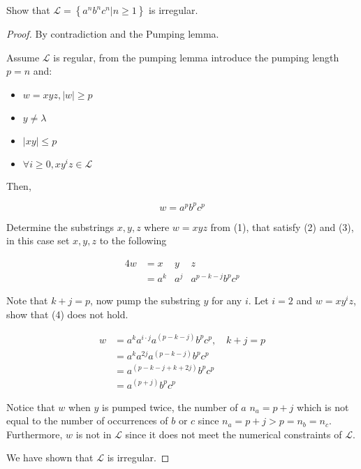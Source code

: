 \begin{ex}
    Show that $\mathcal{L} = \left\{a^nb^nc^n|n\geq 1\right\}$ is irregular.
\end{ex}

\begin{proof}
    By contradiction and the Pumping lemma.

    Assume $\mathcal{L}$ is regular, from the pumping lemma introduce the pumping length $p=n$ and:
    \begin{itemize}
        \item $w=xyz, |w| \geq p$
        \item $y\neq \lambda$
        \item $|xy|\leq p$
        \item $\forall i\geq 0, xy^iz\in \mathcal{L}$
    \end{itemize}

    Then,
    
    \[
        w = a^p b^p c^p
    \]

    Determine the substrings $x,y,z$ where $w=xyz$ from (1), that satisfy (2) and (3), in this case set $x,y,z$ to the following
    
    \begin{alignat*}{4}
    w & = x &y & z \\
      & = a^k &a^j & a^{p-k-j}b^pc^p
    \end{alignat*}  


    Note that $k+j = p$, now pump the substring $y$ for any $i$. Let $i = 2$ and $w=xy^iz$, show that (4) does not hold.

    \begin{align*}
    w & = a^k a^{i\cdot j}a^{(p-k-j)}b^pc^p,\quad k+j=p \\
          & = a^k a^{2j}a^{(p-k-j)}b^pc^p \\
          & = a^{(p-k-j+k+2j)}b^pc^p \\
          & = a^{(p+j)}b^pc^p
    \end{align*}

    Notice that $w$ when $y$ is pumped twice, the number of $a$ $n_a=p+j$ which is not equal to the number of occurrences of $b$ or $c$ since $n_a=p+j>p=n_b=n_c$. Furthermore, $w$ is not in $\mathcal{L}$ since it does not meet the numerical constraints of $\mathcal{L}$.

    We have shown that $\mathcal{L}$ is irregular.
    
\end{proof}